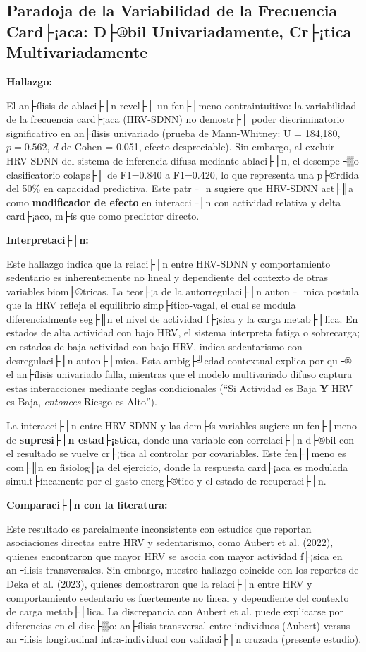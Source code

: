\subsection{Paradoja de la Variabilidad de la Frecuencia Card├¡aca: D├®bil Univariadamente, Cr├¡tica Multivariadamente}
\label{subsec:discusion_paradoja_hrv}

\textbf{Hallazgo:}

El an├ílisis de ablaci├│n revel├│ un fen├│meno contraintuitivo: la variabilidad de la frecuencia card├¡aca (HRV-SDNN) no demostr├│ poder discriminatorio significativo en an├ílisis univariado (prueba de Mann-Whitney: U = 184,180, $p=0.562$, $d$ de Cohen = 0.051, efecto despreciable). Sin embargo, al excluir HRV-SDNN del sistema de inferencia difusa mediante ablaci├│n, el desempe├▒o clasificatorio colaps├│ de F1=0.840 a F1=0.420, lo que representa una p├®rdida del 50\% en capacidad predictiva. Este patr├│n sugiere que HRV-SDNN act├║a como \textbf{modificador de efecto} en interacci├│n con actividad relativa y delta card├¡aco, m├ís que como predictor directo.

\textbf{Interpretaci├│n:}

Este hallazgo indica que la relaci├│n entre HRV-SDNN y comportamiento sedentario es inherentemente no lineal y dependiente del contexto de otras variables biom├®tricas. La teor├¡a de la autorregulaci├│n auton├│mica postula que la HRV refleja el equilibrio simp├ítico-vagal, el cual se modula diferencialmente seg├║n el nivel de actividad f├¡sica y la carga metab├│lica. En estados de alta actividad con bajo HRV, el sistema interpreta fatiga o sobrecarga; en estados de baja actividad con bajo HRV, indica sedentarismo con desregulaci├│n auton├│mica. Esta ambig├╝edad contextual explica por qu├® el an├ílisis univariado falla, mientras que el modelo multivariado difuso captura estas interacciones mediante reglas condicionales (``Si Actividad es Baja \textbf{Y} HRV es Baja, \textit{entonces} Riesgo es Alto'').

La interacci├│n entre HRV-SDNN y las dem├ís variables sugiere un fen├│meno de \textbf{supresi├│n estad├¡stica}, donde una variable con correlaci├│n d├®bil con el resultado se vuelve cr├¡tica al controlar por covariables. Este fen├│meno es com├║n en fisiolog├¡a del ejercicio, donde la respuesta card├¡aca es modulada simult├íneamente por el gasto energ├®tico y el estado de recuperaci├│n.

\textbf{Comparaci├│n con la literatura:}

Este resultado es parcialmente inconsistente con estudios que reportan asociaciones directas entre HRV y sedentarismo, como Aubert et al. (2022), quienes encontraron que mayor HRV se asocia con mayor actividad f├¡sica en an├ílisis transversales. Sin embargo, nuestro hallazgo coincide con los reportes de Deka et al. (2023), quienes demostraron que la relaci├│n entre HRV y comportamiento sedentario es fuertemente no lineal y dependiente del contexto de carga metab├│lica. La discrepancia con Aubert et al. puede explicarse por diferencias en el dise├▒o: an├ílisis transversal entre individuos (Aubert) versus an├ílisis longitudinal intra-individual con validaci├│n cruzada (presente estudio).

